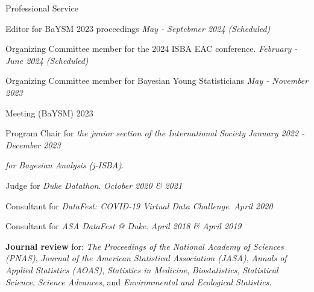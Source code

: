 \documentclass{resume} %
\begin{document}
\begin{rSection}{Professional Service}
	
Editor for BaYSM 2023 proceedings 	\hfill {\em May - Septebmer 2024 (Scheduled)}

\smallskip 
	
Organizing Committee member for the 2024 ISBA EAC conference. 	\hfill {\em February - June 2024 (Scheduled)}
	
\smallskip
	
Organizing Committee member for Bayesian Young Statisticians  \hfill {\em May - November 2023}

\vspace{-0.1in}
Meeting (BaYSM) 2023 

\smallskip

Program Chair for \emph{the junior section of the International Society} \hfill {\em January 2022 - December 2023}

\vspace{-0.1in}
\emph{for Bayesian Analysis (j-ISBA)}.

\smallskip





Judge for \emph{Duke Datathon}.  \hfill {\em October 2020 \& 2021}







\smallskip

Consultant for \emph{DataFest: COVID-19 Virtual Data Challenge}.  \hfill {\em April 2020}



\smallskip

Consultant for \emph{ASA DataFest @ Duke}. \hfill {\em April 2018 \& April 2019}

\smallskip

\textbf{Journal review} for: \emph{The Proceedings of the National Academy of Sciences (PNAS)}, \emph{Journal of the American Statistical Association (JASA)},  \emph{Annals of Applied Statistics (AOAS)}, \emph{Statistics in Medicine}, \emph{Biostatistics}, \emph{Statistical Science},  \emph{Science Advances}, and \emph{Environmental and Ecological Statistics}. 

\end{rSection}
\end{document}
